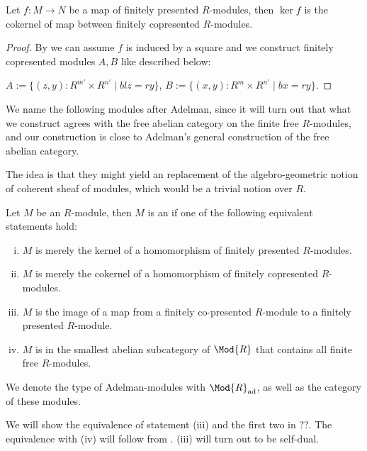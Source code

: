 \begin{lemma}
  \label{kernel-fp-is-cok-fcp}       
  Let $f:M\to N$ be a map of finitely presented $R$-modules, then $\ker f$ is the cokernel of map between finitely copresented $R$-modules.
\end{lemma}

\begin{proof}
  By  we can assume $f$ is induced by a square and we construct finitely copresented modules $A,B$ like described below:
  \begin{center}
   \end{center}
   $A:=\{(z,y):R^{m'}\times R^{n'}\mid blz=ry\}$, $B:=\{(x,y):R^{m}\times R^{n'}\mid bx=ry\}$.
\end{proof}

We name the following modules after Adelman, since it will turn out that what we construct agrees with the free abelian category on the finite free $R$-modules, and our construction is close to Adelman's general construction of the free abelian category.

The idea is that they might yield an replacement of the algebro-geometric notion of coherent sheaf of modules, which would be a trivial notion over $R$.  

\begin{definition}
  Let $M$ be an $R$-module, then $M$ is an  if one of the following equivalent statements hold:
  \begin{enumerate}[(i)]
  \item $M$ is merely the kernel of a homomorphism of finitely presented $R$-modules.
  \item $M$ is merely the cokernel of a homomorphism of finitely copresented $R$-modules.
  \item $M$ is the image of a map from a finitely co-presented $R$-module to a finitely presented $R$-module.
  \item $M$ is in the smallest abelian subcategory of $\Mod{R}$ that contains all finite free $R$-modules.
  \end{enumerate}
  We denote the type of Adelman-modules with $\Mod{R}_{\mathrm{ad}}$, as well as the category of these modules.
\end{definition}
We will show the equivalence of statement (iii) and the first two in ??.
The equivalence with (iv) will follow from .
(iii) will turn out to be self-dual.

